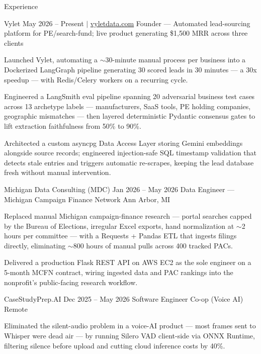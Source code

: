 \documentclass[
	11pt
]{../../../template}
\begin{document}
	\begin{rSection}{E}{xperience}
		\begin{rSectionEntry}
			{Vylet}
			{May 2026 -- Present $\vert$ \href{https://vyletdata.com}{vyletdata.com}}
			{Founder --- Automated lead-sourcing platform for PE/search-fund; live product generating \$1,500 MRR across three clients}
			{}
			{}

			\item Launched Vylet, automating a $\sim$30-minute manual process per business into a Dockerized LangGraph pipeline generating 30 scored leads in 30 minutes --- a 30x speedup --- with Redis/Celery workers on a recurring cycle.
			\item Engineered a LangSmith eval pipeline spanning 20 adversarial business test cases across 13 archetype labels --- manufacturers, SaaS tools, PE holding companies, geographic mismatches --- then layered deterministic Pydantic consensus gates to lift extraction faithfulness from 50\% to 90\%.
			\item Architected a custom asyncpg Data Access Layer storing Gemini embeddings alongside source records; engineered injection-safe SQL timestamp validation that detects stale entries and triggers automatic re-scrapes, keeping the lead database fresh without manual intervention.
		\end{rSectionEntry}

		\begin{rSectionEntry}
			{Michigan Data Consulting (MDC)}
			{Jan 2026 -- May 2026}
			{Data Engineer --- Michigan Campaign Finance Network}
			{}
			{Ann Arbor, MI}

			\item Replaced manual Michigan campaign-finance research --- portal searches capped by the Bureau of Elections, irregular Excel exports, hand normalization at $\sim$2 hours per committee --- with a Requests + Pandas ETL that ingests filings directly, eliminating $\sim$800 hours of manual pulls across 400 tracked PACs.
			\item Delivered a production Flask REST API on AWS EC2 as the sole engineer on a 5-month MCFN contract, wiring ingested data and PAC rankings into the nonprofit's public-facing research workflow.
		\end{rSectionEntry}

		\begin{rSectionEntry}
			{CaseStudyPrep.AI}
			{Dec 2025 -- May 2026}
			{Software Engineer Co-op (Voice AI)}
			{}
			{Remote}

			\item Eliminated the silent-audio problem in a voice-AI product --- most frames sent to Whisper were dead air --- by running Silero VAD client-side via ONNX Runtime, filtering silence before upload and cutting cloud inference costs by 40\%.
		\end{rSectionEntry}
	\end{rSection}
\end{document}
